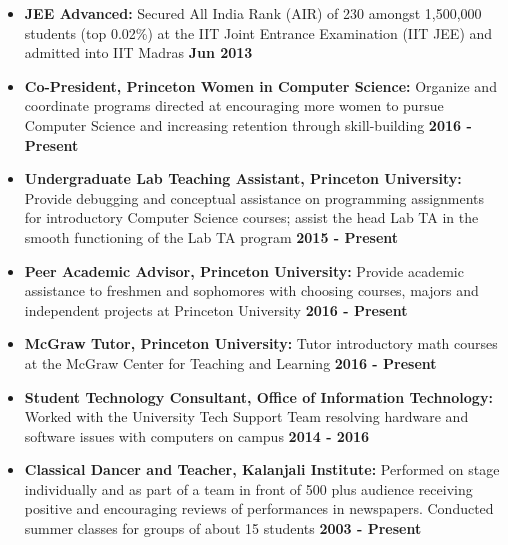 \documentclass[margin]{res}
\begin{document}
\begin{resume}
\begin{itemize}
\item
{\bf {JEE Advanced:}} Secured All India Rank (AIR) of 230 amongst 1,500,000 students (top 0.02\%) at the IIT Joint Entrance Examination (IIT JEE) and admitted into IIT Madras	{\bf \hfill Jun 2013}
\end{itemize}

\begin{itemize}
\section {Co-curricular Activities}
\item
{\bf {Co-President, Princeton Women in Computer Science:}} Organize and coordinate programs directed at encouraging more women to pursue Computer Science and increasing retention through skill-building {\bf \hfill 2016 - Present}

\item
{\bf {Undergraduate Lab Teaching Assistant, Princeton University:}} Provide debugging and conceptual assistance on programming assignments for introductory Computer Science courses; assist the head Lab TA in the smooth functioning of the Lab TA program {\bf \hfill 2015 - Present}

\item
{\bf {Peer Academic Advisor, Princeton University:}} Provide academic assistance to freshmen and sophomores with choosing courses, majors and independent projects at Princeton University {\bf \hfill 2016 - Present}

\item
{\bf {McGraw Tutor, Princeton University:}} Tutor introductory math courses at the McGraw Center for Teaching and Learning {\bf  \hfill 2016 - Present}

\item
{\bf {Student Technology Consultant, Office of Information Technology:}} Worked with the University Tech Support Team resolving hardware and software issues with computers on campus {\bf \hfill 2014 - 2016}
\end{itemize}

\begin{itemize}
\section {Extracurricular Activities}
\item
{\bf {Classical Dancer and Teacher, Kalanjali Institute:}} Performed on stage individually and as part of a team in front of 500 plus audience receiving positive and encouraging reviews of performances in newspapers. Conducted summer classes for groups of about 15 students {\bf \hfill 2003 - Present}
\end{itemize}



\end{resume}
\end{document}
